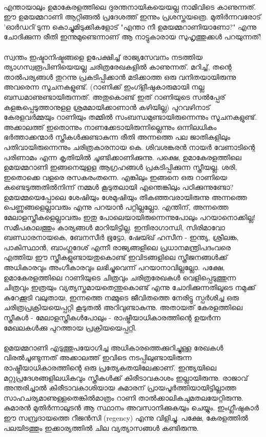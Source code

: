 \paragraph{}എന്തായാലും ഉമാകേരളത്തിലെ ദുരന്തനായികയെയല്ല നാമിവിടെ കാണുന്നത്. ഈ ഉമയമ്മറാണി ആറ്റിങ്ങൽ പ്രദേശത്ത് ഇന്നും പ്രശസ്തയത്രെ. മുതിർന്നവരോട് 'ഓർഡറി'ടുന്ന കൊച്ചുമിടുക്കികളോട് "എന്താ നീ ഉമയമ്മറാണിയാണോ?" എന്നു ചോദിക്കുന്ന രീതി ഇന്നുമുണ്ടെന്നാണ് ആ നാട്ടുകാരായ സുഹൃത്തുക്കൾ പറയുന്നത്!

\paragraph{}സ്വന്തം ഇഷ്ടാനിഷ്ടങ്ങളെ ഉപേക്ഷിച്ച് രാജ്യസേവനം നടത്തിയ ത്യാഗസ്വരൂപിണിയെയല്ല ചരിത്രരേഖകളിൽ കാണുന്നത്. മറിച്ച്, തന്റെ താൽപര്യങ്ങൾ തുറന്നു പ്രകടിപ്പിക്കാൻ മടിക്കാത്ത ഒരു വനിതയായിരുന്നു അവരെന്ന സൂചനകളുണ്ട്. (റാണിക്ക് ഇംഗ്ളീഷുകാരുമായി നല്ല ബന്ധമാണുണ്ടായിരുന്നത്. അതുകൊണ്ട് ഇത് റാണിയുടെ സൽപ്പേര് കളങ്കപ്പെടുത്താനുളള ശ്രമമായിക്കാണാൻ കഴിയില്ല) പുറവഴിനാട് കേരളവർമ്മയും റാണിയും തമ്മിൽ സംബന്ധമുണ്ടായിരുന്നെന്നും സൂചനകളുണ്ട്. അക്കാലത്ത് ഇതൊന്നും നാണക്കേടായിരുന്നില്ലെന്നും ഒന്നിലധികം ഭർത്താക്കന്മാർ സ്ത്രീകൾക്കുണ്ടാകുന്ന രീതി അന്നത്തെ പല ജാതികളിലും പതിവായിരുന്നെന്നും ചരിത്രകാരനായ കെ. ശിവശങ്കരൻ നായർ വേണാടിന്റെ പരിണാമം എന്ന കൃതിയിൽ ചൂണ്ടിക്കാണിക്കുന്നു. പക്ഷെ, ഉമാകേരളത്തിലെ ഉമയമ്മറാണി ഇങ്ങനെയുളള ആഗ്രഹങ്ങൾ പ്രകടിപ്പിക്കുന്ന സ്ത്രീയല്ല. ശരി, ഇതൊക്കെ വളരെ രസകരംതന്നെ. എങ്കിലും ഇങ്ങനെ ഒരു റാണിയെ കണ്ടെടുത്തതിൽനിന്ന് നമ്മൾ കൂടുതലായി എന്തെങ്കിലും പഠിക്കുന്നുണ്ടോ? ഉമയമ്മയെപ്പോലെ ശേഷിയും ശേമുഷിയും തികഞ്ഞവരായിരുന്നു അന്നത്തെ പെണ്ണുങ്ങളെല്ലാവരും എന്നു പറയാൻ പറ്റില്ലല്ലോ. എന്തിന്, അന്നത്തെ മേലാളസ്ത്രീകളെല്ലാവരും ഇതു പോലെയായിരുന്നെന്നുപോലും പറയാനൊക്കില്ല! സമീപകാലത്തും കാര്യങ്ങൾ മാറിയിട്ടില്ല. ഇന്ദിരാഗാന്ധി, സിരിമാവോ ബണ്ഡാരനായകെ, ബേനസീർ ഭൂട്ടോ, ഷേയ്ഖ് ഹസീന - ഇന്ത്യ, ശ്രീലങ്ക, പാകിസ്ഥാൻ, ബാംഗ്ലദേശ് എന്നീ രാജ്യങ്ങളിലെ പ്രധാനമന്ത്രിപദംവരെ എത്തിയ ഈ സ്ത്രീകളുണ്ടായതുകൊണ്ട് ഇവിടങ്ങളിലെ സ്ത്രീജനങ്ങൾക്ക് അധികാരവും അംഗീകാരവും ലഭിച്ചുവെന്ന് പറയാനാവില്ലല്ലോ. പക്ഷേ, ഉമാകേരളത്തിലെ റാണിയുടെ ചിത്രവും ചരിത്രരേഖകൾ വെളിപ്പെടുത്തുന്ന ചിത്രവും ഇത്രയും വ്യത്യസ്തമായതെന്തുകൊണ്ട് എന്നു ചോദിക്കുന്നതിലൂടെ നമുക്ക് കുറേക്കൂടി വലുതായ, ഇന്നത്തെ നമ്മുടെ ജീവിതത്തെ നേരിട്ടു സ്പർശിച്ച ഒരു ചരിത്രപ്രക്രിയയെപ്പറ്റി കൂടുതൽ അറിവുണ്ടാകുന്നു. അതായത് കേരളത്തിലെ സ്ത്രീകൾ - മേലാളസ്ത്രീകൾപോലും - രാഷ്ട്രീയാധികാരത്തിന്റെ ഉയർന്ന മേഖലകൾക്കു പുറത്തായ പ്രക്രിയയെപ്പറ്റി.

\paragraph{}ഉമയമ്മറാണി എടുത്തുപയോഗിച്ച അധികാരത്തെക്കുറിച്ചുള്ള രേഖകൾ വിരൽചൂണ്ടുന്നത് അക്കാലത്ത് ഇവിടെ നടപ്പിലുണ്ടായിരുന്ന രാഷ്ട്രീയാധികാരത്തിന്റെ ഒരു പ്രത്യേകതയിലേക്കാണ്. ഇന്ത്യയിലെ മറ്റുപ്രദേശങ്ങളിലധികവും സ്ത്രീകൾക്ക് കിരീടാവകാശം ഇല്ലായിരുന്നു. രാജാവ് അന്തരിച്ചാൽ കിരീടാവകാശിയായ കുമാരന് പ്രായപൂർത്തിയായിട്ടില്ലാത്ത സാഹചര്യമാണുള്ളതെങ്കിൽമാത്രം റാണി താൽക്കാലികചുമതലയേറ്റിരുന്നു. കുമാരൻ മുതിർന്നാലുടൻ ആ സ്ഥാനം അവസാനിക്കുകയും ചെയ്യും. ഇംഗ്ലീഷുകാർ ഈ സമ്പ്രദായത്തെ റീജൻസി (regency) എന്നു വിളിച്ചു. പക്ഷേ, കേരളത്തിൽ പലയിടത്തും ഇക്കാര്യത്തിൽ ചില വ്യത്യാസങ്ങൾ കണ്ടിരുന്നു.


